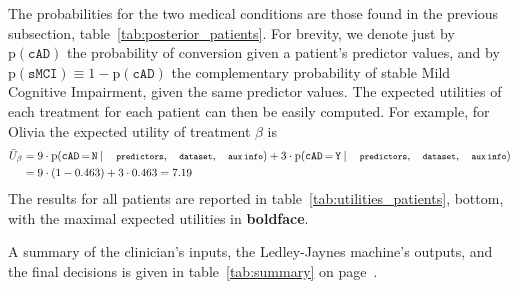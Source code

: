 \documentclass[utf8]{FrontiersinHarvard_mod} %
\newcommand*{\mo}[1][=]{\mathord{\,#1\,}}
\newcommand*{\p}{\mathrm{p}}%
\renewcommand*{\|}[1][]{\nonscript\:#1\vert\nonscript\:\mathopen{}}
\newcommand*{\eU}{\bar{U}}
\newcommand*{\cad}{\texttt{cAD}}
\newcommand*{\smci}{\texttt{sMCI}}
\newcommand*{\yes}{\texttt{Y}}
\newcommand*{\no}{\texttt{N}}
\newcommand*{\predictors}{\texttt{\footnotesize predictors}}
\newcommand*{\dataset}{\texttt{\footnotesize dataset}}
\newcommand*{\auxinfo}{\texttt{\footnotesize aux\,info}}
\newcommand*{\mci}{Mild Cognitive Impairment}
\newcommand*{\ljm}{Ledley-Jaynes machine}
\begin{document}
The probabilities for the two medical conditions are those found in the previous subsection, table~\ref{tab:posterior_patients}. For brevity, we denote just by $\p(\cad)$ the probability of conversion given a patient's predictor values, and by $\p(\smci)\equiv 1- \p(\cad)$ the complementary probability of stable \mci, given the same predictor values. The expected utilities of each treatment for each patient can then be easily computed. For example, for Olivia the expected utility of treatment $\beta$ is
\begin{equation}
  \label{eq:utility_olivia_example}
  \begin{split}
  \eU_{\beta} &=
  9 \cdot \p(\cad\mo\no \| \predictors,\dataset,\auxinfo) +
  3 \cdot \p(\cad\mo\yes \| \predictors,\dataset,\auxinfo)
  \\&=  9 \cdot (1-0.463) + 3 \cdot 0.463 = 7.19
\end{split}
\end{equation}
The results for all patients are reported in table~\ref{tab:utilities_patients}, bottom, with the maximal expected utilities in \textbf{boldface}.

A summary of the clinician's inputs, the \ljm's outputs, and the final decisions is given in table~\ref{tab:summary} on page~\pageref{tab:summary}.



 

\end{document}
